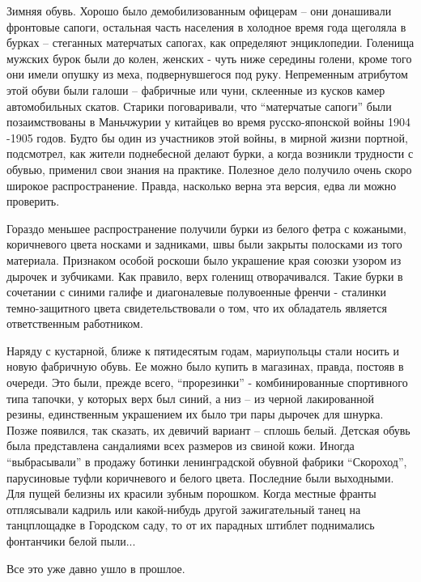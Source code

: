 Зимняя обувь. Хорошо было демобилизованным офицерам – они донашивали фронтовые
сапоги, остальная часть населения в холодное время года щеголяла в бурках –
стеганных матерчатых сапогах, как определяют энциклопедии. Голенища мужских
бурок были до колен,  женских -  чуть ниже середины голени, кроме того они
имели опушку из меха, подвернувшегося под руку. Непременным атрибутом этой
обуви были галоши – фабричные или чуни, склеенные из кусков камер автомобильных
скатов. Старики поговаривали, что \enquote{матерчатые сапоги} были позаимствованы в
Маньчжурии у китайцев во время русско-японской войны 1904 -1905 годов. Будто бы
один из участников этой войны, в мирной жизни портной,  подсмотрел, как жители
поднебесной  делают бурки, а когда возникли трудности с обувью, применил свои
знания на практике. Полезное дело получило очень скоро широкое распространение.
Правда, насколько верна эта версия, едва ли можно проверить.

Гораздо меньшее распространение получили бурки из белого фетра с кожаными,
коричневого цвета носками и задниками, швы были закрыты  полосками из того
материала. Признаком особой роскоши было украшение края союзки узором из
дырочек и зубчиками. Как правило, верх голенищ отворачивался. Такие бурки в
сочетании с синими галифе и диагоналевые полувоенные френчи - сталинки
темно-защитного цвета свидетельствовали о том, что их обладатель является
ответственным работником. 

Наряду с кустарной, ближе к пятидесятым годам, мариупольцы стали носить и новую
фабричную обувь. Ее можно было купить в магазинах, правда, постояв в очереди.
Это были, прежде всего, \enquote{прорезинки} - комбинированные спортивного типа
тапочки, у которых верх был синий, а низ – из черной лакированной резины,
единственным украшением их было три пары дырочек для шнурка. Позже появился,
так сказать, их девичий вариант – сплошь белый. Детская обувь была представлена
сандалиями всех размеров из свиной кожи. Иногда \enquote{выбрасывали} в продажу ботинки
ленинградской обувной фабрики \enquote{Скороход}, парусиновые туфли коричневого и
белого цвета. Последние были выходными. Для пущей белизны их красили зубным
порошком. Когда местные франты отплясывали  кадриль или какой-нибудь другой
зажигательный танец на танцплощадке в Городском саду, то от их парадных штиблет
поднимались фонтанчики белой пыли...

Все это уже давно ушло в прошлое.
